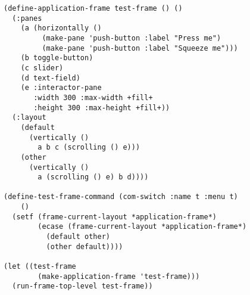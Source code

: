 \begin{verbatim}
(define-application-frame test-frame () ()
  (:panes
    (a (horizontally ()
         (make-pane 'push-button :label "Press me")
         (make-pane 'push-button :label "Squeeze me")))
    (b toggle-button)
    (c slider)
    (d text-field)
    (e :interactor-pane
       :width 300 :max-width +fill+
       :height 300 :max-height +fill+))
  (:layout
    (default 
      (vertically ()
        a b c (scrolling () e)))
    (other
      (vertically ()
        a (scrolling () e) b d))))

(define-test-frame-command (com-switch :name t :menu t)
    ()
  (setf (frame-current-layout *application-frame*)
        (ecase (frame-current-layout *application-frame*)
          (default other)
          (other default))))

(let ((test-frame 
        (make-application-frame 'test-frame)))
  (run-frame-top-level test-frame))
\end{verbatim}
